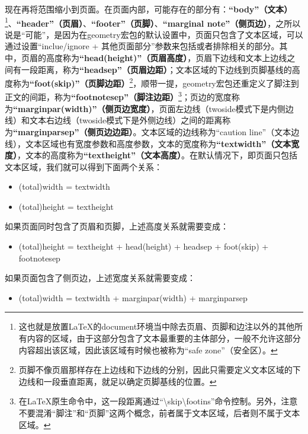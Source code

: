﻿\documentclass{article}
\begin{document}
现在再将范围缩小到页面。在页面内部，可能存在的部分有：\textbf{``body''（文本）}\footnote{这也就是放置\LaTeX 的document环境当中除去页眉、页脚和边注以外的其他所有内容的区域，由于这部分包含了文本最重要的主体部分，一般不允许这部分内容超出该区域，因此该区域有时候也被称为``safe zone''（安全区）。}、\textbf{``header''（页眉）}、\textbf{``footer''（页脚）}、\textbf{``marginal note''（侧页边）}，之所以说是``可能''，是因为在geometry宏包的默认设置中，页面只包含了文本区域，可以通过设置``inclue/ignore + 其他页面部分''参数来包括或者排除相关的部分。其中，页眉的高度称为\textbf{``head(height)''（页眉高度）}，页眉下边线和文本上边线之间有一段距离，称为\textbf{``headsep''（页眉边距）}；文本区域的下边线到页脚基线的高度称为\textbf{``foot(skip)''（页脚边距）}\footnote{页脚不像页眉那样存在上边线和下边线的分别，因此只需要定义文本区域的下边线和一段垂直距离，就足以确定页脚基线的位置。}，顺带一提，geometry宏包还重定义了脚注到正文的间距，称为\textbf{``footnotesep''（脚注边距）}\footnote{在\LaTeX 原生命令中，这一段距离通过``\textbackslash skip\textbackslash footins''命令控制。另外，注意不要混淆``脚注''和``页脚''这两个概念，前者属于文本区域，后者则不属于文本区域。}；页边的宽度称为\textbf{``marginpar(width)''（侧页边宽度）}，页面左边线（twoside模式下是内侧边线）和文本右边线（twoside模式下是外侧边线）之间的距离称为\textbf{``marginparsep''（侧页边边距）}。文本区域的边线称为``caution line''（文本边线），文本区域也有宽度参数和高度参数，文本的宽度称为\textbf{``textwidth''（文本宽度）}，文本的高度称为\textbf{``textheight''（文本高度）}。在默认情况下，即页面只包括文本区域，我们就可以得到下面两个关系：
\begin{itemize}
    \item (total)width = textwidth
    \item (total)height = textheight
\end{itemize}
如果页面同时包含了页眉和页脚，上述高度关系就需要变成：
\begin{itemize}
    \item (total)height = textheight + head(height) + headsep + foot(skip) + footnotesep
\end{itemize}
如果页面包含了侧页边，上述宽度关系就需要变成：
\begin{itemize}
    \item (total)width = textwidth + marginpar(width) + marginparsep
\end{itemize}

\end{document}
